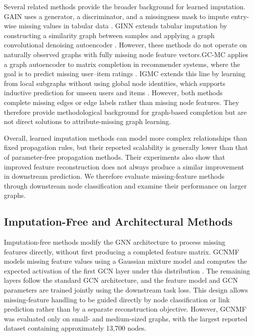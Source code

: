 Several related methods provide the broader background for learned imputation. GAIN uses a generator, a discriminator, and a missingness mask to impute entry-wise missing values in tabular data \cite{yoon2018gain}. GINN extends tabular imputation by constructing a similarity graph between samples and applying a graph convolutional denoising autoencoder \cite{spinelli2020missing}. However, these methods do not operate on naturally observed graphs with fully missing node feature vectors.GC-MC applies a graph autoencoder to matrix completion in recommender systems, where the goal is to predict missing user--item ratings \cite{berg2017graph}. IGMC extends this line by learning from local subgraphs without using global node identities, which supports inductive prediction for unseen users and items \cite{zhang2019inductive}. However, both methods complete missing edges or edge labels rather than missing node features. They therefore provide methodological background for graph-based completion but are not direct solutions to attribute-missing graph learning.

Overall, learned imputation methods can model more complex relationships than fixed propagation rules, but their reported scalability is generally lower than that of parameter-free propagation methods. Their experiments also show that improved feature reconstruction does not always produce a similar improvement in downstream prediction. We therefore evaluate missing-feature methods through downstream node classification and examine their performance on larger graphs.

\subsection{Imputation-Free and Architectural Methods}

Imputation-free methods modify the GNN architecture to process missing features directly, without first producing a completed feature matrix. GCNMF models missing feature values using a Gaussian mixture model and computes the expected activation of the first GCN layer under this distribution \cite{taguchi2021graph}. The remaining layers follow the standard GCN architecture, and the feature model and GCN parameters are trained jointly using the downstream task loss. This design allows missing-feature handling to be guided directly by node classification or link prediction rather than by a separate reconstruction objective. However, GCNMF was evaluated only on small- and medium-sized graphs, with the largest reported dataset containing approximately 13,700 nodes.

